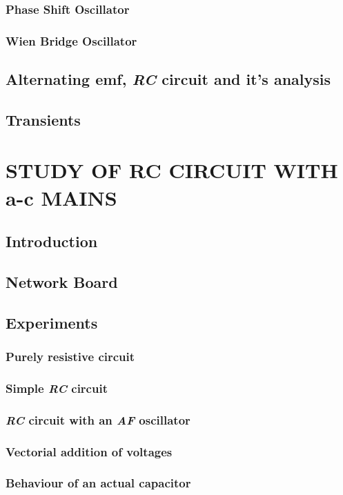 \documentclass[12pt]{book}
\begin{document}
\subsection{Phase Shift Oscillator}
\subsection{Wien Bridge Oscillator}
\section{Alternating emf, \textit{RC} circuit and it's analysis}
\section{Transients}

\chapter{STUDY OF RC CIRCUIT WITH a-c MAINS}
\section{Introduction}
\section{Network Board}
\section{Experiments}
\subsection{Purely resistive circuit}
\subsection{Simple \textit{RC} circuit}
\subsection{\textit{RC} circuit with an \textit{AF} oscillator}
\subsection{Vectorial addition of voltages}
\subsection{Behaviour of an actual capacitor}
\end{document}
